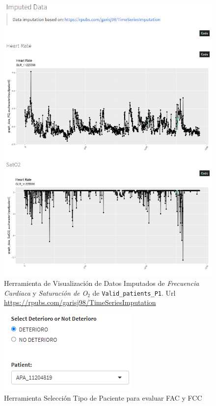 \begin{figure}[H]
    \centering
    \includegraphics[scale = 1]{./img/graphic2.png}
    \caption{Herramienta de Visualización de Datos Imputados de \textit{Frecuencia Cardiaca} y \textit{Saturación de O$_2$} de \texttt{Valid\_patients\_P1}. Url \url{https://rpubs.com/garisj98/TimeSeriesImputation}}\label{fig:visualizacion-datos-2}
\end{figure}

\begin{figure}[H]
    \centering
    \includegraphics[scale = 1.25]{./img/graphic3.png}
    \caption{Herramienta Selección Tipo de Paciente para evaluar FAC y FCC}\label{fig:visualizacion-datos-3}
\end{figure}

